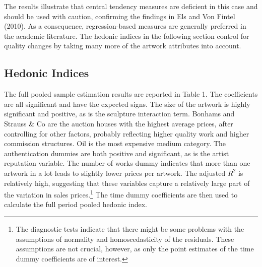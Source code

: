\documentclass[12pt,]{article}
\let\rmarkdownfootnote\footnote%
\def\footnote{\protect\rmarkdownfootnote}
\begin{document}
The results illustrate that central tendency measures are deficient in
this case and should be used with caution, confirming the findings in
Els and Von Fintel (2010). As a consequence, regression-based measures
are generally preferred in the academic literature. The hedonic indices
in the following section control for quality changes by taking many more
of the artwork attributes into account.

\subsection{Hedonic Indices}\label{hedonic-indices}

The full pooled sample estimation results are reported in Table 1. The
coefficients are all significant and have the expected signs. The size
of the artwork is highly significant and positive, as is the sculpture
interaction term. Bonhams and Strauss \& Co are the auction houses with
the highest average prices, after controlling for other factors,
probably reflecting higher quality work and higher commission
structures. Oil is the most expensive medium category. The
authentication dummies are both positive and significant, as is the
artist reputation variable. The number of works dummy indicates that
more than one artwork in a lot leads to slightly lower prices per
artwork. The adjusted \(R^2\) is relatively high, suggesting that these
variables capture a relatively large part of the variation in sales
prices.\footnote{The diagnostic tests indicate that there might be some
  problems with the assumptions of normality and homoscedasticity of the
  residuals. These assumptions are not crucial, however, as only the
  point estimates of the time dummy coefficients are of interest.} The
time dummy coefficients are then used to calculate the full period
pooled hedonic index.
\end{document}
